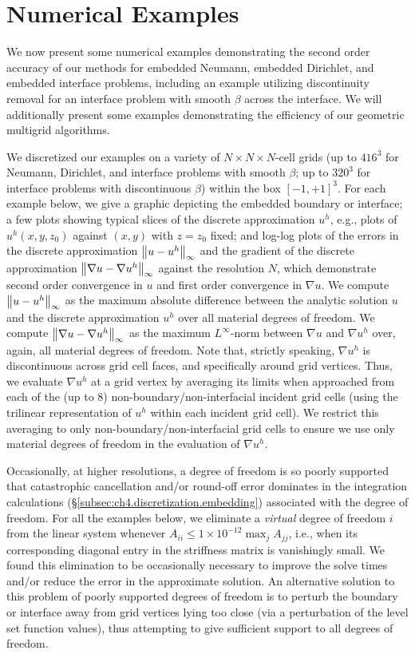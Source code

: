 \section{Numerical Examples} \label{sec:ch4.examples}

We now present some numerical examples demonstrating the second order accuracy of our methods for embedded Neumann, embedded Dirichlet, and embedded interface problems, including an example utilizing discontinuity removal for an interface problem with smooth $\beta$ across the interface. We will additionally present some examples demonstrating the efficiency of our geometric multigrid algorithms.

We discretized our examples on a variety of $N \times N \times N$-cell grids (up to $416^3$ for Neumann, Dirichlet, and interface problems with smooth $\beta$; up to $320^3$ for interface problems with discontinuous $\beta$) within the box $[-1,+1]^3$. For each example below, we give a graphic depicting the embedded boundary or interface; a few plots showing typical slices of the discrete approximation $u^h$, e.g., plots of $u^h(x,y,z_0)$ against $(x,y)$ with $z = z_0$ fixed; and log-log plots of the errors in the discrete approximation $\left\lVert u - u^h \right\rVert_{\infty}$ and the gradient of the discrete approximation $\left\lVert \nabla u - \nabla u^h \right\rVert_{\infty}$ against the resolution $N$, which demonstrate second order convergence in $u$ and first order convergence in $\nabla u$. We compute $\left\lVert u - u^h \right\rVert_{\infty}$ as the maximum absolute difference between the analytic solution $u$ and the discrete approximation $u^h$ over all material degrees of freedom. We compute $\left\lVert \nabla u - \nabla u^h \right\rVert_{\infty}$ as the maximum $L^{\infty}$-norm between $\nabla u$ and $\nabla u^h$ over, again, all material degrees of freedom. Note that, strictly speaking, $\nabla u^h$ is discontinuous across grid cell faces, and specifically around grid vertices. Thus, we evaluate $\nabla u^h$ at a grid vertex by averaging its limits when approached from each of the (up to $8$) non-boundary/non-interfacial incident grid cells (using the trilinear representation of $u^h$ within each incident grid cell). We restrict this averaging to only non-boundary/non-interfacial grid cells to ensure we use only material degrees of freedom in the evaluation of $\nabla u^h$.

Occasionally, at higher resolutions, a degree of freedom is so poorly supported that catastrophic cancellation and/or round-off error dominates in the integration calculations (\S\ref{subsec:ch4.discretization.embedding}) associated with the degree of freedom. For all the examples below, we eliminate a \emph{virtual} degree of freedom $i$ from the linear system whenever $A_{ii} \leq 1 \times 10^{-12} \max_j A_{jj}$, i.e., when its corresponding diagonal entry in the striffness matrix is vanishingly small. We found this elimination to be occasionally necessary to improve the solve times and/or reduce the error in the approximate solution. An alternative solution to this problem of poorly supported degrees of freedom is to perturb the boundary or interface away from grid vertices lying too close (via a perturbation of the level set function values), thus attempting to give sufficient support to all degrees of freedom.

